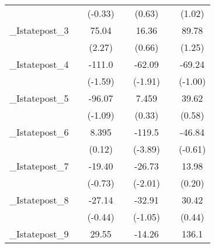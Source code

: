 {\begin{tabular}{l*{6}{c}}
            &                     &     (-0.33)         &                     &      (0.63)         &                     &      (1.02)         \\
[1em]
\_Istatepost\_3&                     &       75.04\sym{*}  &                     &       16.36         &                     &       89.78         \\
            &                     &      (2.27)         &                     &      (0.66)         &                     &      (1.25)         \\
[1em]
\_Istatepost\_4&                     &      -111.0         &                     &      -62.09         &                     &      -69.24         \\
            &                     &     (-1.59)         &                     &     (-1.91)         &                     &     (-1.00)         \\
[1em]
\_Istatepost\_5&                     &      -96.07         &                     &       7.459         &                     &       39.62         \\
            &                     &     (-1.09)         &                     &      (0.33)         &                     &      (0.58)         \\
[1em]
\_Istatepost\_6&                     &       8.395         &                     &      -119.5\sym{***}&                     &      -46.84         \\
            &                     &      (0.12)         &                     &     (-3.89)         &                     &     (-0.61)         \\
[1em]
\_Istatepost\_7&                     &      -19.40         &                     &      -26.73         &                     &       13.98         \\
            &                     &     (-0.73)         &                     &     (-2.01)         &                     &      (0.20)         \\
[1em]
\_Istatepost\_8&                     &      -27.14         &                     &      -32.91         &                     &       30.42         \\
            &                     &     (-0.44)         &                     &     (-1.05)         &                     &      (0.44)         \\
[1em]
\_Istatepost\_9&                     &       29.55         &                     &      -14.26         &                     &       136.1         \\

\end{tabular}}
